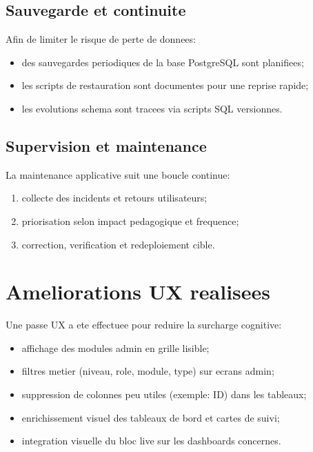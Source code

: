 ﻿\documentclass[12pt,a4paper,oneside]{report}
\begin{document}
\subsection{Sauvegarde et continuite}

Afin de limiter le risque de perte de donnees:
\begin{itemize}
  \item des sauvegardes periodiques de la base PostgreSQL sont planifiees;
  \item les scripts de restauration sont documentes pour une reprise rapide;
  \item les evolutions schema sont tracees via scripts SQL versionnes.
\end{itemize}

\subsection{Supervision et maintenance}

La maintenance applicative suit une boucle continue:
\begin{enumerate}
  \item collecte des incidents et retours utilisateurs;
  \item priorisation selon impact pedagogique et frequence;
  \item correction, verification et redeploiement cible.
\end{enumerate}

\section{Ameliorations UX realisees}

Une passe UX a ete effectuee pour reduire la surcharge cognitive:
\begin{itemize}
  \item affichage des modules admin en grille lisible;
  \item filtres metier (niveau, role, module, type) sur ecrans admin;
  \item suppression de colonnes peu utiles (exemple: ID) dans les tableaux;
  \item enrichissement visuel des tableaux de bord et cartes de suivi;
  \item integration visuelle du bloc live sur les dashboards concernes.
\end{itemize}
\end{document}
